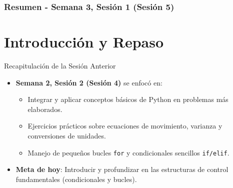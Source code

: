 \documentclass[10pt]{beamer}
\begin{document}
\myfront{}

\begin{frame}
  \titlepage
\end{frame}

\begin{frame}
  \frametitle{Resumen - Semana 3, Sesión 1 (Sesión 5)}
  \tableofcontents
\end{frame}


\section{Introducción y Repaso}

\begin{frame}{Recapitulación de la Sesión Anterior}
  \begin{itemize}
    \item \textbf{Semana 2, Sesión 2 (Sesión 4)} se enfocó en:
      \begin{itemize}
        \item Integrar y aplicar conceptos básicos de Python en problemas más elaborados.
        \item Ejercicios prácticos sobre ecuaciones de movimiento, varianza y conversiones de unidades.
        \item Manejo de pequeños bucles \texttt{for} y condicionales sencillos \texttt{if/elif}.
      \end{itemize}
    \item \textbf{Meta de hoy}: Introducir y profundizar en las estructuras de control fundamentales (condicionales y bucles).
  \end{itemize}
\end{frame}
\end{document}
